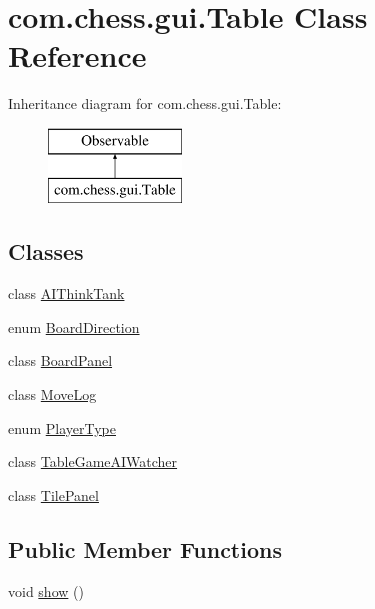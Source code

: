 \hypertarget{classcom_1_1chess_1_1gui_1_1_table}{}\section{com.\+chess.\+gui.\+Table Class Reference}
\label{classcom_1_1chess_1_1gui_1_1_table}
Inheritance diagram for com.\+chess.\+gui.\+Table\+:\begin{figure}[H]
\begin{center}
\leavevmode
\includegraphics[height=2.000000cm]{classcom_1_1chess_1_1gui_1_1_table}
\end{center}
\end{figure}
\subsection*{Classes}
\begin{DoxyCompactItemize}
\item 
class \mbox{\hyperlink{classcom_1_1chess_1_1gui_1_1_table_1_1_a_i_think_tank}{A\+I\+Think\+Tank}}
\item 
enum \mbox{\hyperlink{enumcom_1_1chess_1_1gui_1_1_table_1_1_board_direction}{Board\+Direction}}
\item 
class \mbox{\hyperlink{classcom_1_1chess_1_1gui_1_1_table_1_1_board_panel}{Board\+Panel}}
\item 
class \mbox{\hyperlink{classcom_1_1chess_1_1gui_1_1_table_1_1_move_log}{Move\+Log}}
\item 
enum \mbox{\hyperlink{enumcom_1_1chess_1_1gui_1_1_table_1_1_player_type}{Player\+Type}}
\item 
class \mbox{\hyperlink{classcom_1_1chess_1_1gui_1_1_table_1_1_table_game_a_i_watcher}{Table\+Game\+A\+I\+Watcher}}
\item 
class \mbox{\hyperlink{classcom_1_1chess_1_1gui_1_1_table_1_1_tile_panel}{Tile\+Panel}}
\end{DoxyCompactItemize}
\subsection*{Public Member Functions}
\begin{DoxyCompactItemize}
\item 
void \mbox{\hyperlink{classcom_1_1chess_1_1gui_1_1_table_ac78d44d76f615c849ca2b99c4f0fa408}{show}} ()
\end{DoxyCompactItemize}
